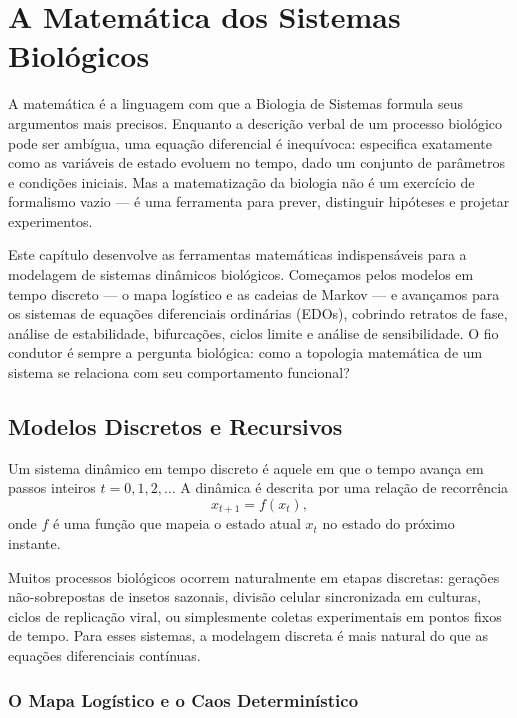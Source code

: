 \chapter{A Matemática dos Sistemas Biológicos}
\label{cap:04}

A matemática é a linguagem com que a Biologia de Sistemas formula seus argumentos mais
precisos. Enquanto a descrição verbal de um processo biológico pode ser ambígua, uma
equação diferencial é inequívoca: especifica exatamente como as variáveis de estado
evoluem no tempo, dado um conjunto de parâmetros e condições iniciais. Mas a matematização
da biologia não é um exercício de formalismo vazio --- é uma ferramenta para prever,
distinguir hipóteses e projetar experimentos.

Este capítulo desenvolve as ferramentas matemáticas indispensáveis para a modelagem de
sistemas dinâmicos biológicos. Começamos pelos modelos em tempo discreto --- o mapa
logístico e as cadeias de Markov --- e avançamos para os sistemas de equações diferenciais
ordinárias (EDOs), cobrindo retratos de fase, análise de estabilidade, bifurcações, ciclos
limite e análise de sensibilidade. O fio condutor é sempre a pergunta biológica: como a
topologia matemática de um sistema se relaciona com seu comportamento funcional?

\section{Modelos Discretos e Recursivos}

\begin{definicaoenv}
Um sistema dinâmico em tempo discreto é aquele em que o tempo avança em passos inteiros
$t = 0, 1, 2, \ldots$ A dinâmica é descrita por uma relação de recorrência
\begin{equation}
  x_{t+1} = f(x_t),
\end{equation}
onde $f$ é uma função que mapeia o estado atual $x_t$ no estado do próximo instante.
\end{definicaoenv}

Muitos processos biológicos ocorrem naturalmente em etapas discretas: gerações
não-sobrepostas de insetos sazonais, divisão celular sincronizada em culturas, ciclos de
replicação viral, ou simplesmente coletas experimentais em pontos fixos de tempo. Para esses
sistemas, a modelagem discreta é mais natural do que as equações diferenciais contínuas.

\subsection{O Mapa Logístico e o Caos Determinístico}

